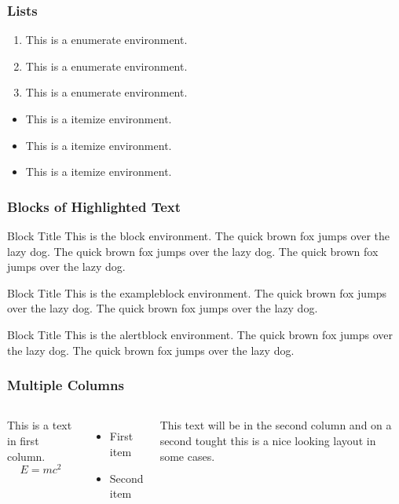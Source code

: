 \documentclass[notheorems,11pt,xcolor=table]{beamer}
\numberwithin{theorem}{section}
\numberwithin{definition}{section}
\numberwithin{lemma}{section}
\theoremstyle{example}
\numberwithin{figure}{section}
\numberwithin{table}{section}
\numberwithin{equation}{section}
\begin{document}

\begin{frame}
\frametitle{Lists}

\begin{enumerate}
  \item This is a enumerate environment.
  \item This is a enumerate environment.
  \item This is a enumerate environment.
\end{enumerate}

\vspace{2ex}
\begin{itemize}[<+-| alert@+>]
\item This is a itemize environment.
\item This is a itemize environment.
\item This is a itemize environment.
\end{itemize}
\end{frame}


\begin{frame}
\frametitle{Blocks of Highlighted Text}
\begin{block}{Block Title}
This is the block environment. The quick brown fox jumps over the lazy dog. The quick brown fox jumps over the lazy dog. The quick brown fox jumps over the lazy dog.
\end{block}

\begin{exampleblock}{Block Title}
This is the exampleblock environment. The quick brown fox jumps over the lazy dog. The quick brown fox jumps over the lazy dog.
\end{exampleblock}

\begin{alertblock}{Block Title}
This is the alertblock environment. The quick brown fox jumps over the lazy dog. The quick brown fox jumps over the lazy dog.
\end{alertblock}
\end{frame}


\begin{frame}
\frametitle{Multiple Columns}
\begin{columns}[c] %

This is a text in first column.
$$E=mc^2$$
\begin{itemize}
\item First item
\item Second item
\end{itemize}

This text will be in the second column
and on a second tought this is a nice looking
layout in some cases.

\end{columns}
\end{frame}
\end{document}
